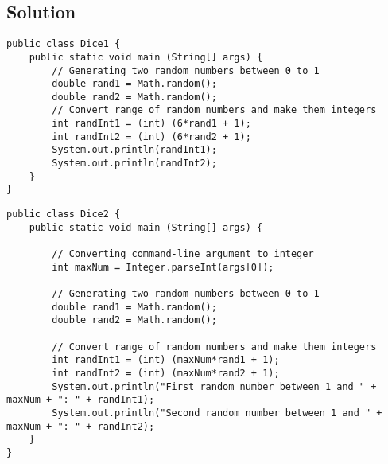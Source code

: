 \subsection*{Solution}
\begin{lstlisting}
public class Dice1 {
	public static void main (String[] args) {
		// Generating two random numbers between 0 to 1
		double rand1 = Math.random();
		double rand2 = Math.random();
		// Convert range of random numbers and make them integers
		int randInt1 = (int) (6*rand1 + 1);
		int randInt2 = (int) (6*rand2 + 1);
		System.out.println(randInt1);
		System.out.println(randInt2);
	}
}
\end{lstlisting}
\begin{lstlisting}
public class Dice2 {
	public static void main (String[] args) {

		// Converting command-line argument to integer
		int maxNum = Integer.parseInt(args[0]);

		// Generating two random numbers between 0 to 1
		double rand1 = Math.random();
		double rand2 = Math.random();

		// Convert range of random numbers and make them integers
		int randInt1 = (int) (maxNum*rand1 + 1);
		int randInt2 = (int) (maxNum*rand2 + 1);
		System.out.println("First random number between 1 and " + maxNum + ": " + randInt1);
		System.out.println("Second random number between 1 and " + maxNum + ": " + randInt2);
	}
}
\end{lstlisting}
